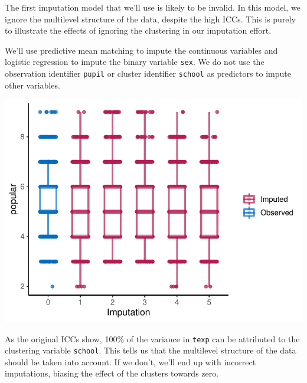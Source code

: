 \documentclass[
]{jss}
\begin{document}
The first imputation model that we'll use is likely to be invalid. In
this model, we ignore the multilevel structure of the data, despite the
high ICCs. This is purely to illustrate the effects of ignoring the
clustering in our imputation effort.

We'll use predictive mean matching to impute the continuous variables
and logistic regression to impute the binary variable \texttt{sex}. We
do not use the observation identifier \texttt{pupil} or cluster
identifier \texttt{school} as predictors to impute other variables.

\begin{CodeChunk}
\end{CodeChunk}

\begin{CodeChunk}


\begin{center}\includegraphics{Manuscript_files/figure-latex/pop_ignored_eval-1} \end{center}

\end{CodeChunk}

As the original ICCs show, 100\% of the variance in \texttt{texp} can be
attributed to the clustering variable \texttt{school}. This tells us
that the multilevel structure of the data should be taken into account.
If we don't, we'll end up with incorrect imputations, biasing the effect
of the clusters towards zero.
\end{document}

